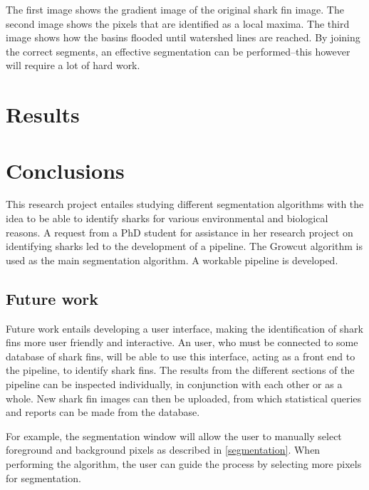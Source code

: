 \documentclass[a4paper,10pt]{article}
\begin{document}
\noindent The first image shows the gradient image of the original shark fin
image.  The second image shows the pixels that are identified as a local maxima.
 The third image shows how the basins flooded until watershed lines are reached.
 By joining the correct segments, an effective segmentation can be performed--this however will require
 a lot of hard work.

\newpage
\section{Results}
\subsection{}


\subsection{}


\newpage
\section{Conclusions}
This research project entailes studying different segmentation algorithms with the idea to be able to identify sharks for various environmental and biological reasons.
A request from a PhD student for assistance in her research project on identifying sharks led to the development of a pipeline. The Growcut algorithm is used as the main segmentation algorithm. A workable pipeline is developed. \\

\subsection{Future work}
Future work entails developing a user
interface, making the identification of shark fins more user friendly and interactive.
An user, who must be connected to some database of shark fins, will be able to
use this interface, acting as a front end to the
  pipeline, to identify shark fins.  The
results from the different sections of the pipeline can be
  inspected individually, in
conjunction with each other or as a whole.  New shark fin images can then be
uploaded, from which statistical queries and reports can be
made from the database.

For example, the segmentation window will allow the user to manually select foreground and background pixels as described in \ref{segmentation}.
When performing the algorithm, the user can guide the process by selecting more pixels for segmentation. \\
\end{document}
